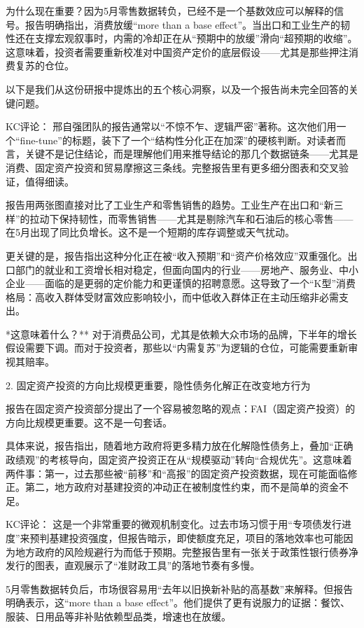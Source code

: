 \documentclass[11pt]{ctexart}
\begin{document}
为什么现在重要？因为5月零售数据转负，已经不是一个基数效应可以解释的信号。报告明确指出，消费放缓“more than a base effect”。当出口和工业生产的韧性还在支撑宏观叙事时，内需的冷却正在从“预期中的放缓”滑向“超预期的收缩”。这意味着，投资者需要重新校准对中国资产定价的底层假设——尤其是那些押注消费复苏的仓位。

以下是我们从这份研报中提炼出的五个核心洞察，以及一个报告尚未完全回答的关键问题。

KC评论： 邢自强团队的报告通常以“不惊不乍、逻辑严密”著称。这次他们用一个“fine-tune”的标题，装下了一个“结构性分化正在加深”的硬核判断。对读者而言，关键不是记住结论，而是理解他们用来推导结论的那几个数据链条——尤其是消费、固定资产投资和贸易摩擦这三条线。完整报告里有更多细分图表和交叉验证，值得细读。

报告用两张图直接对比了工业生产和零售销售的趋势。工业生产在出口和“新三样”的拉动下保持韧性，而零售销售——尤其是剔除汽车和石油后的核心零售——在5月出现了同比负增长。这不是一个短期的库存调整或天气扰动。

更关键的是，报告指出这种分化正在被“收入预期”和“资产价格效应”双重强化。出口部门的就业和工资增长相对稳定，但面向国内的行业——房地产、服务业、中小企业——面临的是更弱的定价能力和更谨慎的招聘意愿。这导致了一个“K型”消费格局：高收入群体受财富效应影响较小，而中低收入群体正在主动压缩非必需支出。

*这意味着什么？** 对于消费品公司，尤其是依赖大众市场的品牌，下半年的增长假设需要下调。而对于投资者，那些以“内需复苏”为逻辑的仓位，可能需要重新审视其赔率。

2. 固定资产投资的方向比规模更重要，隐性债务化解正在改变地方行为

报告在固定资产投资部分提出了一个容易被忽略的观点：FAI（固定资产投资）的方向比规模更重要。这不是一句套话。

具体来说，报告指出，随着地方政府将更多精力放在化解隐性债务上，叠加“正确政绩观”的考核导向，固定资产投资正在从“规模驱动”转向“合规优先”。这意味着两件事：第一，过去那些被“前移”和“高报”的固定资产投资数据，现在可能面临修正。第二，地方政府对基建投资的冲动正在被制度性约束，而不是简单的资金不足。

KC评论： 这是一个非常重要的微观机制变化。过去市场习惯于用“专项债发行进度”来预判基建投资强度，但报告暗示，即使额度充足，项目的落地效率也可能因为地方政府的风险规避行为而低于预期。完整报告里有一张关于政策性银行债券净发行的图表，直观展示了“准财政工具”的落地节奏有多慢。

5月零售数据转负后，市场很容易用“去年以旧换新补贴的高基数”来解释。但报告明确表示，这“more than a base effect”。他们提供了更有说服力的证据：餐饮、服装、日用品等非补贴依赖型品类，增速也在放缓。
\end{document}
